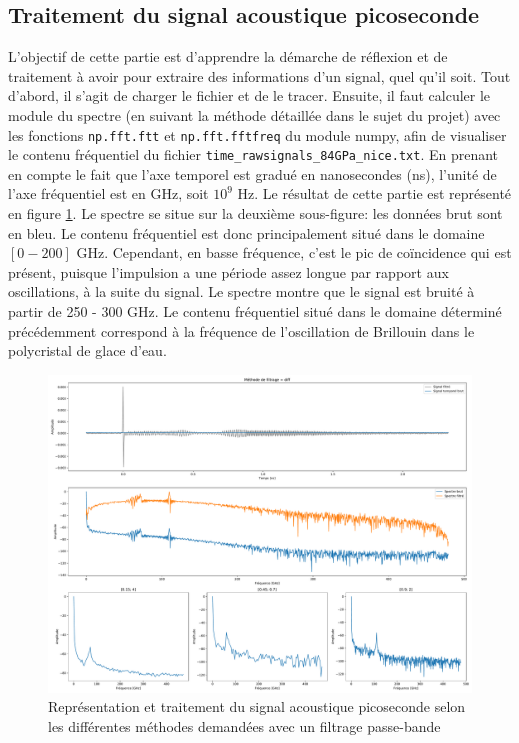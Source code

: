 \documentclass[a4paper, 11pt]{article}
\begin{document}
\subsection{Traitement du signal acoustique picoseconde}
L'objectif de cette partie est d'apprendre la démarche de réflexion et de traitement à avoir pour extraire des informations d'un signal, quel qu'il soit. Tout d'abord, il s'agit de charger le fichier et de le tracer. Ensuite, il faut calculer le module du spectre (en suivant la méthode détaillée dans le sujet du projet) avec les fonctions \verb|np.fft.ftt| et \verb|np.fft.fftfreq| du module numpy, afin de visualiser le contenu fréquentiel du fichier \verb|time_rawsignals_84GPa_nice.txt|. En prenant en compte le fait que l'axe temporel est gradué en nanosecondes (ns), l'unité de l'axe fréquentiel est en GHz, soit $10^9$ Hz.
Le résultat de cette partie est représenté en figure \ref{fig:tds1}. Le spectre se situe sur la deuxième sous-figure: les données brut sont en bleu. Le contenu fréquentiel est donc principalement situé dans le domaine $[0 - 200]$ GHz. Cependant, en basse fréquence, c'est le pic de coïncidence qui est présent, puisque l'impulsion a une période assez longue par rapport aux oscillations, à la suite du signal. Le spectre montre que le signal est bruité à partir de 250 - 300 GHz. Le contenu fréquentiel situé dans le domaine déterminé précédemment correspond à la fréquence de l'oscillation de Brillouin dans le polycristal de glace d'eau.

\begin{figure}[H]
	\centering
	\includegraphics[width=\linewidth]{Figures/TDS1.pdf}
	\caption{Représentation et traitement du signal acoustique picoseconde selon les différentes méthodes demandées avec un filtrage passe-bande}
	\label{fig:tds1}
\end{figure}
\end{document}
